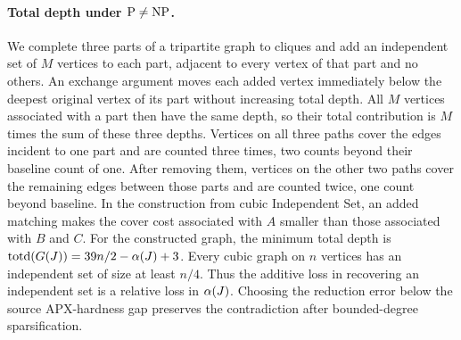 \paragraph{Total depth under $\mathrm{P}\ne\mathrm{NP}$.}
We complete three parts of a tripartite graph to cliques and add an
independent set of $M$ vertices to each part, adjacent to every vertex
of that part and no others. An exchange argument moves each added
vertex immediately below the deepest original vertex of its part without
increasing total depth. All $M$ vertices associated with a part then
have the same depth, so their total contribution is $M$ times the
sum of these three depths. Vertices on all three paths cover the edges
incident to one part and are counted three times, two counts beyond
their baseline count of one. After removing them, vertices on the
other two paths cover the remaining edges between those parts and are
counted twice, one count beyond baseline. In the construction
from cubic Independent Set, an added matching makes
the cover cost associated with $A$ smaller than those associated with
$B$ and $C$. For the constructed graph, the minimum total depth is
$\operatorname{totd}(G(J))=39n/2-\alpha(J)+3$.
Every cubic graph on $n$ vertices has an independent set of size at
least $n/4$. Thus the additive loss in recovering an independent set
is a relative loss in $\alpha(J)$. Choosing the reduction error
below the source APX-hardness gap preserves the contradiction after
bounded-degree sparsification.

